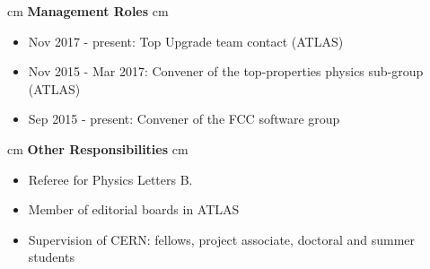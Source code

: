 \documentclass[12pt]{article}
\begin{document}




 cm
{\bf \large Management Roles}
 cm
\begin{itemize}
\itemsep0em
\item[] Nov 2017 - present: Top Upgrade team contact (ATLAS)
\item[] Nov 2015 - Mar 2017: Convener of the top-properties physics sub-group (ATLAS)
\item[] Sep 2015 - present: Convener of the FCC software group
\end{itemize}

 cm
{\bf \large Other Responsibilities}
 cm
\begin{itemize}
\itemsep0em
\item[] Referee for Physics Letters B.
\item[] Member of editorial boards in ATLAS
\item[] Supervision of CERN: fellows, project associate, doctoral and summer students
\end{itemize}
\end{document}
